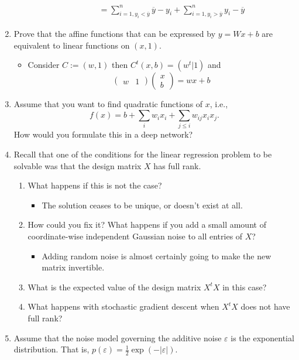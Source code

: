 \documentclass{article}
\begin{document}
\begin{enumerate}[label=\arabic*.]
\begin{enumerate}[label=\arabic*.]
\begin{itemize}
\begin{align*}
				&= \sum_{i = 1, y_i < \overline{y}}^n \overline{y} - y_i + \sum_{i = 1, y_i > \overline{y}}^n y_i - \overline{y}
				\end{align*}
			\end{itemize}
	\end{enumerate}
\item Prove that the affine functions that can be expressed by $y = Wx + b$ are equivalent to linear functions on $(x, 1)$.
	\begin{itemize}
		\item Consider $C := (w, 1)$ then $C^t(x, b) = (w^t|1)$ and
		$$
		\begin{pmatrix}
		w & 1
		\end{pmatrix}
		\begin{pmatrix}
		x \\ b
		\end{pmatrix} = 
		wx + b
		$$
	\end{itemize}
\item Assume that you want to find quadratic functions of $x$, i.e.,
	$$
	f(x) = b + \sum_i w_i x_i + \sum_{j \leq i} w_{ij} x_i x_j.
	$$
	How would you formulate this in a deep network?
\item Recall that one of the conditions for the linear regression problem to be solvable was that the design matrix $X$ has full rank.
	\begin{enumerate}[label=\arabic*.]
	\item What happens if this is not the case?
		\begin{itemize}
			\item The solution ceases to be unique, or doesn't exist at all.
		\end{itemize}
	\item How could you fix it? What happens if you add a small amount of coordinate-wise independent Gaussian noise to all entries of $X$?
		\begin{itemize}
			\item Adding random noise is almost certainly going to make the new matrix invertible. 
		\end{itemize}
	\item What is the expected value of the design matrix $X^tX$ in this case?
	\item What happens with stochastic gradient descent when $X^tX$ does not have full rank?
	\end{enumerate}
\item Assume that the noise model governing the additive noise $\varepsilon$ is the exponential distribution. That is, $p(\varepsilon) = \frac{1}{2}\exp(-|\varepsilon|)$.

\end{enumerate}
\end{document}

